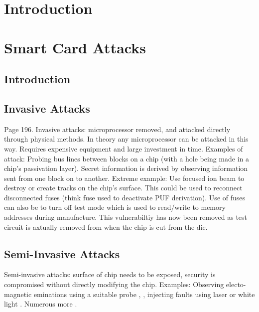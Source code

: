 \section{Introduction}
\section{Smart Card Attacks}
\subsection{Introduction}
\subsection{Invasive Attacks}
Page 196.
Invasive attacks: microprocessor removed, and attacked directly through physical methods.
In theory any microprocessor can be attacked in this way.
Requires expensive equipment and large investment in time.
Examples of attack:
Probing bus lines between blocks on a chip (with a hole being made in a chip's passivation layer). Secret information is derived by observing information sent from one block on to another.
Extreme example: Use focused ion beam to destroy or create tracks on the chip's surface. This could be used to reconnect disconnected fuses (think fuse used to deactivate PUF derivation). Use of fuses can also be to turn off test mode which is used to read/write to memory addresses during manufacture. This vulnerabiltiy has now been removed as test circuit is axtually removed from when the chip is cut from the die. \cite{Anderson1996} \cite{Kommerling1999}
\subsection{Semi-Invasive Attacks}
Semi-invasive attacks: surface of chip needs to be exposed, security is compromised without directly modifying the chip.
Examples: Observing electo-magnetic eminations using a suitable probe \cite{Gandolfi2007}, \cite{Quisquater2001}, injecting faults using laser \cite{Bar-el2006} or white light \cite{Skorobogatov2007}. Numerous more \cite{Skorobogatov2005}.

